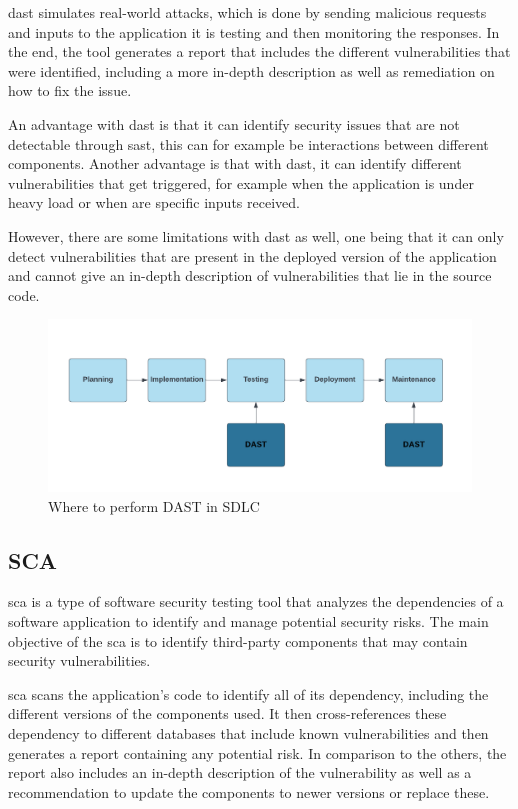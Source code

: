 \acrshort{dast} simulates real-world attacks, which is done by sending malicious requests and inputs to the application it is testing and then monitoring the responses. In the end, the tool generates a report that includes the different vulnerabilities that were identified, including a more in-depth description as well as remediation on how to fix the issue. \cite{dast}

An advantage with \acrshort{dast} is that it can identify security issues that are not detectable through \acrshort{sast}, this can for example be interactions between different components. Another advantage is that with \acrshort{dast}, it can identify different vulnerabilities that get triggered, for example when the application is under heavy load or when are specific inputs received.

However, there are some limitations with \acrshort{dast} as well, one being that it can only detect vulnerabilities that are present in the deployed version of the application and cannot give an in-depth description of vulnerabilities that lie in the source code.
\begin{figure}[H]
    \centering
    \includegraphics[width=0.8\columnwidth]{Images/dast.png}
    \caption{Where to perform DAST in SDLC} 
    \label{fig: Where to perform DAST in SDLC}
\end{figure}



\subsection{SCA}
\acrlong{sca} is a type of software security testing tool that analyzes the dependencies of a software application to identify and manage potential security risks. The main objective of the \acrshort{sca} is to identify third-party components that may contain security vulnerabilities. \cite{sca}

 \acrshort{sca} scans the application's code to identify all of its \gls{dependency}, including the different versions of the components used. It then cross-references these \gls{dependency} to different databases that include known vulnerabilities and then generates a report containing any potential risk. In comparison to the others, the report also includes an in-depth description of the vulnerability as well as a recommendation to update the components to newer versions or replace these. 

